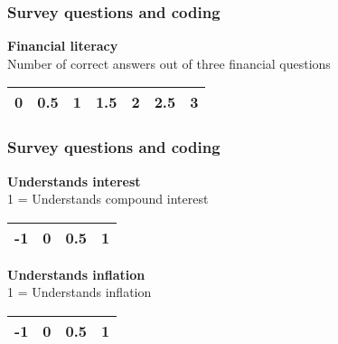 \documentclass{beamer}              %
\begin{document}











\begin{frame}\label{Questions}

\frametitle{Survey questions and coding}
\linespread{1.2}
\textbf{Financial literacy} \\
\hspace{1cm} Number of correct answers out of three financial questions
\\
\vspace{0.3cm}
\begin{tabular}{lllllll} 
\hline
\multicolumn{1}{c}{0} & \multicolumn{1}{c}{0.5} & \multicolumn{1}{c}{1}  & \multicolumn{1}{c}{1.5} & \multicolumn{1}{c}{2} & \multicolumn{1}{c}{2.5} & \multicolumn{1}{c}{3}\\
\hline
\end{tabular}

\end{frame}






















\begin{frame}\label{Questions}

\frametitle{Survey questions and coding}
\linespread{1.2}
\textbf{Understands interest} \\
\hspace{1cm}1 = Understands compound interest
\\
\vspace{0.3cm}
\begin{tabular}{llll} 
\hline
\multicolumn{1}{c}{-1} & \multicolumn{1}{c}{0} & \multicolumn{1}{c}{0.5} & \multicolumn{1}{c}{1} \\
\hline
\end{tabular}

\vspace{1.3cm}

\textbf{Understands inflation} \\
\hspace{1cm}1 = Understands inflation
\\
\vspace{0.3cm}
\begin{tabular}{cccc} 
\hline
\multicolumn{1}{c}{-1} & \multicolumn{1}{c}{0} & \multicolumn{1}{c}{0.5} & \multicolumn{1}{c}{1} \\
\hline
\end{tabular}

\end{frame}
\end{document}
